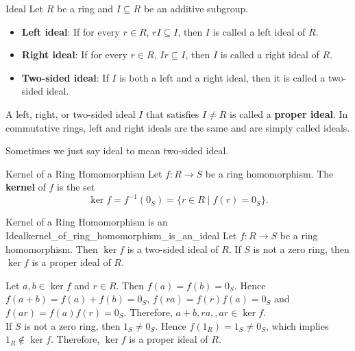\begin{definition}{Ideal}{}
    Let \( R \) be a ring and \( I \subseteq R \) be an additive subgroup.
    \begin{itemize}
        \item \textbf{Left ideal}: If for every \( r \in R \), \( rI \subseteq I \), then \( I \) is called a left ideal of \( R \).
        \item \textbf{Right ideal}: If for every \( r \in R \), \( Ir \subseteq I \), then \( I \) is called a right ideal of \( R \).
        \item \textbf{Two-sided ideal}: If \( I \) is both a left and a right ideal, then it is called a two-sided ideal.
    \end{itemize}

A left, right, or two-sided ideal \( I \) that satisfies \( I \ne R \) is called a \textbf{proper ideal}. In commutative rings, left and right ideals are the same and are simply called ideals. 
\end{definition}
Sometimes we just say ideal to mean two-sided ideal.

\begin{definition}{Kernel of a Ring Homomorphism}{}
    Let $f:R\to S$ be a ring homomorphism. The \textbf{kernel} of $f$ is the set
    \[
        \ker f=f^{-1}(0_S)=\{r\in R\mid f(r)=0_S\}.
    \]
\end{definition}

\begin{proposition}{Kernel of a Ring Homomorphism is an Ideal}{kernel_of_ring_homomorphism_is_an_ideal}
    Let $f:R\to S$ be a ring homomorphism. Then $\ker f$ is a two-sided ideal of $R$. If $S$ is not a zero ring, then $\ker f$ is a proper ideal of $R$.
\end{proposition}
\begin{prf}
    Let $a,b\in\ker f$ and $r\in R$. Then $f(a)=f(b)=0_S$. Hence $f(a+b)=f(a)+f(b)=0_S$, $f(ra)=f(r)f(a)=0_S$ and $f(ar)=f(a)f(r)=0_S$. Therefore, $a+b,ra,,ar\in\ker f$.\\
    If $S$ is not a zero ring, then $1_S\ne 0_S$. Hence $f(1_R)=1_S\ne 0_S$, which implies $1_R\notin\ker f$. Therefore, $\ker f$ is a proper ideal of $R$.
\end{prf}

